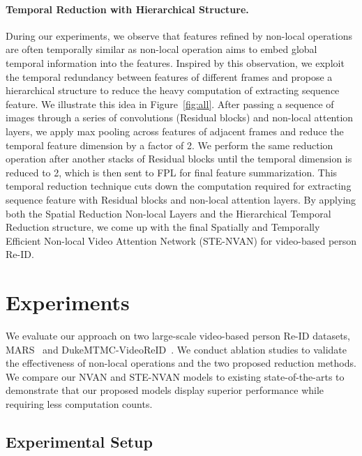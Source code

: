\documentclass{bmvc2k}
\begin{document}
\vspace{-3mm}
\paragraph{Temporal Reduction with Hierarchical Structure.}
During our experiments, we observe that features refined by non-local operations are often temporally similar as non-local operation aims to embed global temporal information into the features.
Inspired by this observation, we exploit the temporal redundancy between features of different frames and propose a hierarchical structure to reduce the heavy computation of extracting sequence feature.
We illustrate this idea in Figure~\ref{fig:all}.
After passing a sequence of images through a series of convolutions (Residual blocks) and non-local attention layers, we apply max pooling across features of adjacent frames and reduce the temporal feature dimension by a factor of 2.
We perform the same reduction operation after another stacks of Residual blocks until the temporal dimension is reduced to 2, which is then sent to FPL for final feature summarization.
This temporal reduction technique cuts down the computation required for extracting sequence feature with Residual blocks and non-local attention layers. 
By applying both the Spatial Reduction Non-local Layers and the Hierarchical Temporal Reduction structure, we come up with the final Spatially and Temporally Efficient Non-local Video Attention Network (STE-NVAN) for video-based person Re-ID.
 \section{Experiments}
\label{sec:exp}

We evaluate our approach on two large-scale video-based person Re-ID datasets, MARS~\cite{mars} and DukeMTMC-VideoReID~\cite{dukevideo}. 
We conduct ablation studies to validate the effectiveness of non-local operations and the two proposed reduction methods. 
We compare our NVAN and STE-NVAN models to existing state-of-the-arts to demonstrate that our proposed models display superior performance while requiring less computation counts.
\vspace{-3mm}
\subsection{Experimental Setup}
\end{document}

